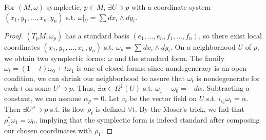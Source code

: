 \begin{theorem}[2: Darboux]
For $(M,\omega)$ symplectic, $p\in M$, $\exists U\ni p$ with a coordinate system $(x_1,y_1,\ldots,x_n,y_n)$ s.t. $\omega|_U=\sum dx_i\wedge dy_i$.
\end{theorem}
\begin{proof}
$(T_pM,\omega_p)$ has a standard basis $(e_1,\ldots,e_n,f_1,\ldots,f_n)$, so there exist local coordinates $(x_1,y_1,\ldots,x_n,y_n)$ s.t. $\omega_p=\sum dx_i\wedge dy_i$. On a neighborhood $U$ of $p$, we obtain two symplectic forms: $\omega$ and the standard form. The family $\omega_t=(1-t)\omega_0+t\omega_1$ is one of closed forms: since nondegeneracy is an open condition, we can shrink our neighborhood to assure that $\omega_t$ is nondegenerate for each $t$ on some $U'\ni p$. Thus, $\exists\alpha\in\Omega^1(U)$ s.t. $\omega_1-\omega_0=-d\alpha$. Subtracting a constant, we can assume $\alpha_p=0$. Let $v_t$ be the vector field on $U$ s.t. $i_{v_t}\omega_t=\alpha$. Then $\exists U''\ni p$ s.t. its flow $\rho_t$ is defined $\forall t$. By the Moser's trick, we fnd that $\rho_1^*\omega_1=\omega_0$, implying that the symplectic form is indeed standard after composing our chosen coordinates with $\rho_1$.
\end{proof}
